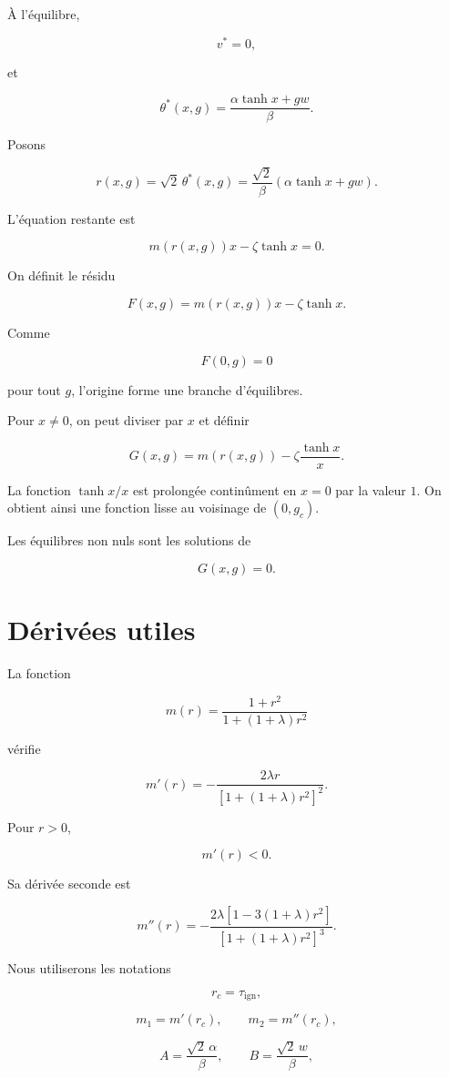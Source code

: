 À l'équilibre,

\[
v^\ast=0,
\]

et

\[
\theta^\ast(x,g)
=
\frac{\alpha\tanh x+gw}{\beta}.
\]

Posons

\[
r(x,g)
=
\sqrt2\,\theta^\ast(x,g)
=
\frac{\sqrt2}{\beta}
\left(
\alpha\tanh x+gw
\right).
\]

L'équation restante est

\[
m(r(x,g))x
-
\zeta\tanh x
=
0.
\]

On définit le résidu

\[
\boxed{
F(x,g)
=
m(r(x,g))x
-
\zeta\tanh x.
}
\]

Comme

\[
F(0,g)=0
\]

pour tout \(g\), l'origine forme une branche d'équilibres.

Pour \(x\neq0\), on peut diviser par \(x\) et définir

\[
G(x,g)
=
m(r(x,g))
-
\zeta\frac{\tanh x}{x}.
\]

La fonction \(\tanh x/x\) est prolongée continûment en \(x=0\) par la
valeur \(1\). On obtient ainsi une fonction lisse au voisinage de
\((0,g_c)\).

Les équilibres non nuls sont les solutions de

\[
G(x,g)=0.
\]

\section{Dérivées utiles}
\label{annexe-resistance-derivees-m}

La fonction

\[
m(r)
=
\frac{1+r^2}
{1+(1+\lambda)r^2}
\]

vérifie

\[
\boxed{
m'(r)
=
-\frac{2\lambda r}
{\left[
1+(1+\lambda)r^2
\right]^2}.
}
\]

Pour \(r>0\),

\[
m'(r)<0.
\]

Sa dérivée seconde est

\[
\boxed{
m''(r)
=
-\frac{
2\lambda
\left[
1-3(1+\lambda)r^2
\right]
}{
\left[
1+(1+\lambda)r^2
\right]^3
}.
}
\]

Nous utiliserons les notations

\[
r_c=\tau_{\mathrm{ign}},
\]

\[
m_1=m'(r_c),
\qquad
m_2=m''(r_c),
\]

\[
A=\frac{\sqrt2\,\alpha}{\beta},
\qquad
B=\frac{\sqrt2\,w}{\beta},
\]

